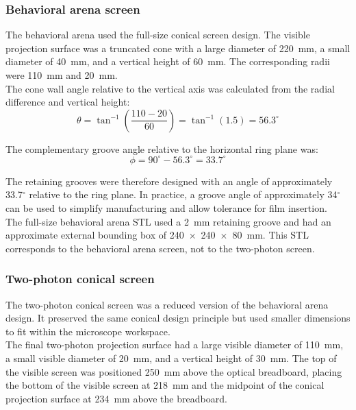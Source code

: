 \subsubsection{Behavioral arena screen}

The behavioral arena used the full-size conical screen design. The visible projection surface was a truncated cone with a large diameter of 220~mm, a small diameter of 40~mm, and a vertical height of 60~mm. The corresponding radii were 110~mm and 20~mm.\\

The cone wall angle relative to the vertical axis was calculated from the radial difference and vertical height:\\

\[
\theta = \tan^{-1}\left(\frac{110 - 20}{60}\right) = \tan^{-1}(1.5) = 56.3^\circ
\]

The complementary groove angle relative to the horizontal ring plane was:\\

\[
\phi = 90^\circ - 56.3^\circ = 33.7^\circ
\]

The retaining grooves were therefore designed with an angle of approximately 33.7$^\circ$ relative to the ring plane. In practice, a groove angle of approximately 34$^\circ$ can be used to simplify manufacturing and allow tolerance for film insertion.\\

The full-size behavioral arena STL used a 2~mm retaining groove and had an approximate external bounding box of 240~$\times$~240~$\times$~80~mm. This STL corresponds to the behavioral arena screen, not to the two-photon screen.\\

\subsubsection{Two-photon conical screen}

The two-photon conical screen was a reduced version of the behavioral arena design. It preserved the same conical design principle but used smaller dimensions to fit within the microscope workspace.\\

The final two-photon projection surface had a large visible diameter of 110~mm, a small visible diameter of 20~mm, and a vertical height of 30~mm. The top of the visible screen was positioned 250~mm above the optical breadboard, placing the bottom of the visible screen at 218~mm and the midpoint of the conical projection surface at 234~mm above the breadboard.\\

